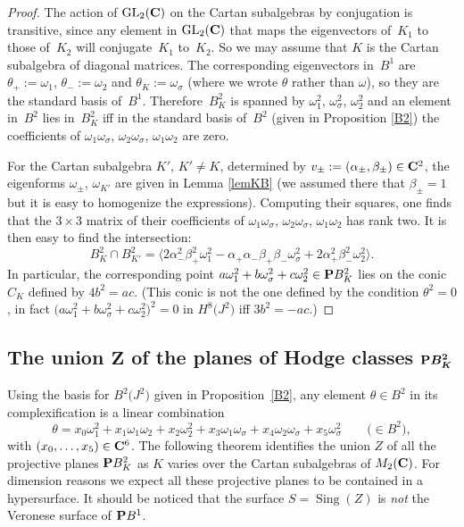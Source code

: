\documentclass[10pt,a4paper]{amsart}
\numberwithin{equation}{section}
\begin{document}
\begin{proof}The action of ${\rm GL}_2({\bf C})$ on the Cartan subalgebras by conjugation is transitive,
since any element in ${\rm GL}_2({\bf C})$ that maps the eigenvectors of~$K_1$ to those of~$K_2$
will conjugate~$K_1$ to~$K_2$.
So we may assume that $K$ is the Cartan subalgebra of diagonal matrices.
The corresponding eigenvectors in~$B^1$ are
$\theta_+:=\omega_1$, $\theta_-:=\omega_2$
and $\theta_K:=\omega_\sigma$ (where we wrote $\theta$ rather than $\omega$),
so they are the standard basis of~$B^1$.
Therefore~$B^2_K$ is spanned by $\omega_1^2$, $\omega_\sigma^2$, $\omega_2^2$
and an element in~$B^2$ lies in~$B^2_K$ iff in the standard basis of~$B^2$ (given in
Proposition \ref{B2}) the coefficients of
$\omega_1\omega_\sigma$, $\omega_2\omega_\sigma$, $\omega_1\omega_2$ are zero.

For the Cartan subalgebra $K'$, $K'\neq K$, determined by $v_\pm:=(\alpha_\pm,\beta_\pm)\in{\bf C}^2$,
the eigenforms $\omega_\pm$, $\omega_{K'}$ are given in Lemma \ref{lemKB}
(we assumed there that $\beta_\pm=1$ but it is easy to homogenize the expressions).
Computing their squares, one finds that the $3\times 3$ matrix
of their coefficients of
$\omega_1\omega_\sigma$, $\omega_2\omega_\sigma$, $\omega_1\omega_2$ has rank two.
It is then easy to find the intersection:
\[
B^2_K\cap B^2_{K'} =
\big\langle 2\alpha_-^2\beta_+^2\omega_1^2 -
\alpha_+\alpha_-\beta_+\beta_-\omega_\sigma^2 + 2\alpha_+^2\beta_-^2\omega_2^2 \big\rangle.
\]
In particular, the corresponding point $a\omega_1^2+b\omega_\sigma^2+c\omega_2^2\in {\bf P} B_K^2$
lies on the conic $C_K$ defined by $4b^2=ac$.
(This conic is not the one defined by the condition $\theta^2=0$,
in fact $\big(a\omega_1^2+b\omega_\sigma^2+c\omega_2^2\big)^2=0$ in $H^8\big(J^2\big)$ iff $3b^2=-ac$.)
\end{proof}

\subsection[The union Z of the planes of Hodge classes PB\_K\^{}2]{The union $\boldsymbol{Z}$ of the planes of Hodge classes $\boldsymbol{{\bf P} B_K^2}$}\label{unz}

Using the basis for $B^2\big(J^2\big)$ given in Proposition~\ref{B2},
any element $\theta \in B^2$ in its complexification is a linear combination
\[
\theta =
x_0\omega_1^2+x_1\omega_1\omega_2+ x_2\omega_2^2 + x_3\omega_1\omega_\sigma +
x_4\omega_2\omega_\sigma + x_5\omega_\sigma^2\qquad\big(\!\!\in B^2\big),
\]
with $(x_0,\dots,x_5)\in{\bf C}^6$.
The following theorem identifies the union $Z$ of all the projective planes ${\bf P} B^2_K$
as $K$ varies over the Cartan subalgebras of $M_2({\bf C})$.
For dimension reasons we expect all these projective planes to be contained in a hypersurface.
It should be noticed that the surface $S=\operatorname{Sing}(Z)$ is \emph{not} the Veronese surface
of ${\bf P} B^1$.
\end{document}

